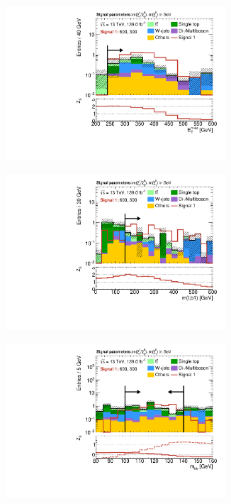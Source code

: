 \begin{figure}
\begin{subfigure}[b]{0.5\linewidth}
	\end{subfigure}\hfill
	\begin{subfigure}[b]{0.5\linewidth}
		\centering\includegraphics[width=0.9\textwidth]{N-1_cut_scan/n1_600_300/met}
	\end{subfigure}\hfill
	\begin{subfigure}[b]{0.5\linewidth}
		\centering\includegraphics[width=0.9\textwidth]{N-1_cut_scan/n1_600_300/mlb1}
	\end{subfigure}\hfill
	\begin{subfigure}[b]{0.5\linewidth}
		\centering\includegraphics[width=0.9\textwidth]{N-1_cut_scan/n1_600_300/mbb_both}

\end{subfigure}
\end{figure}
